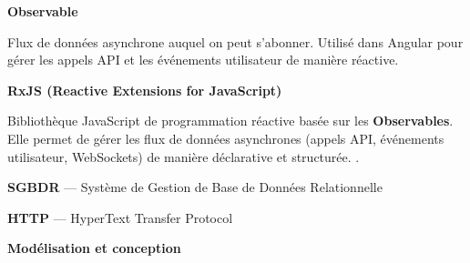 \documentclass[12pt,a4paper]{report}
\begin{document}
\vspace{0.6cm}

\begin{infobox}
\textbf{Observable}

Flux de données asynchrone auquel on peut s'abonner. Utilisé dans Angular pour gérer les appels API et les événements utilisateur de manière réactive.
\end{infobox}

\vspace{0.6cm}

\begin{infobox}
\textbf{RxJS (Reactive Extensions for JavaScript)}

Bibliothèque JavaScript de programmation réactive basée sur les \textbf{Observables}. Elle permet de gérer les flux de données asynchrones (appels API, événements utilisateur, WebSockets) de manière déclarative et structurée. .
\end{infobox}




\vspace{0.4cm}

\begin{accentbox}
\textbf{SGBDR} — Système de Gestion de Base de Données Relationnelle
\end{accentbox}

\vspace{0.4cm}

\begin{accentbox}
\textbf{HTTP} — HyperText Transfer Protocol
\end{accentbox}






\newpage

{\Large\textcolor{marine}{\textbf{Modélisation et conception}}}
\end{document}
